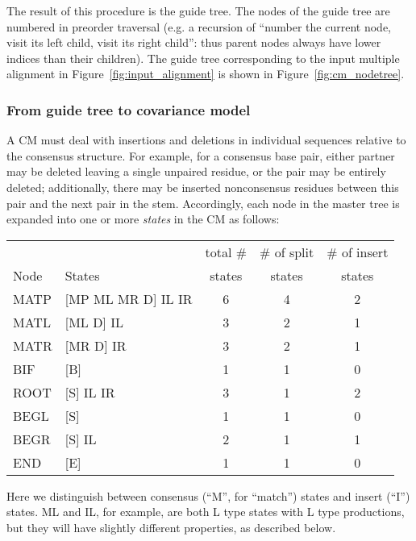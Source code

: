 \documentclass[11pt]{article}
\begin{document}
The result of this procedure is the guide tree. The nodes of the guide
tree are numbered in preorder traversal (e.g. a recursion of ``number
the current node, visit its left child, visit its right child'': thus
parent nodes always have lower indices than their children). The guide
tree corresponding to the input multiple alignment in
Figure~\ref{fig:input_alignment} is shown in
Figure~\ref{fig:cm_nodetree}.

\subsubsection{From guide tree to covariance model}

A CM must deal with insertions and deletions in individual sequences
relative to the consensus structure. For example, for a consensus base
pair, either partner may be deleted leaving a single unpaired residue,
or the pair may be entirely deleted; additionally, there may be
inserted nonconsensus residues between this pair and the next pair in
the stem. Accordingly, each node in the master tree is expanded into
one or more \emph{states} in the CM as follows:

\vspace{0.5em}
\begin{tabular}{llccc}
       &                     & total \#& \# of split& \# of insert\\
Node   &  States             & states  & states     & states \\ \hline
MATP   & [MP ML MR D] IL IR  &   6     &   4        &  2   \\
MATL   & [ML D] IL           &   3     &   2    &  1   \\
MATR   & [MR D] IR           &   3     &   2    &  1   \\
BIF    & [B]                 &   1     &   1    &  0   \\
ROOT   & [S] IL IR           &   3     &   1    &  2   \\
BEGL   & [S]                 &   1     &   1    &  0   \\
BEGR   & [S] IL              &   2     &   1    &  1   \\
END    & [E]                 &   1     &   1    &  0   \\ \hline
\end{tabular}
\vspace{0.5em}

Here we distinguish between consensus (``M'', for ``match'') states
and insert (``I'') states. ML and IL, for example, are both L type
states with L type productions, but they will have slightly different
properties, as described below.
\end{document}
